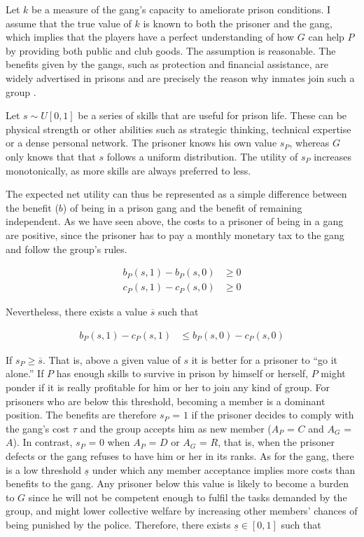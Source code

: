 \documentclass[a4paper,12pt]{article}
\let\footnote=\endnote
\begin{document}
Let $k$ be a measure of the gang's capacity to ameliorate prison conditions. I assume that the true value of $k$ is known to both the prisoner and the gang, which implies that the players have a perfect understanding of how $G$ can help $P$ by providing both public and club goods. The assumption is reasonable. The benefits given by the gangs, such as protection and financial assistance, are widely advertised in prisons and are precisely the reason why inmates join such a group \citep{fleisher2001overview, trammell2012enforcing}.

Let $s \sim U \left[0,1\right]$ be a series of skills that are useful for prison life. These can be physical strength or other abilities such as strategic thinking, technical expertise or a dense personal network. The prisoner knows his own value $s_P$, whereas $G$ only knows that that $s$ follows a uniform distribution. The utility of $s_P$ increases monotonically, as more skills are always preferred to less. 

The expected net utility can thus be represented as a simple difference between the benefit ($b$) of being in a prison gang and the benefit of remaining independent. As we have seen above, the costs to a prisoner of being in a gang are positive, since the prisoner has to pay a monthly monetary tax to the gang and follow the group's rules. 

\begin{align}
b_P\left(s,1\right) - b_P\left(s,0\right) &\geq 0\\
c_P\left(s,1\right) - c_P\left(s,0\right) &\geq 0
\end{align}

Nevertheless, there exists a value $\overline{s}$ such that

\begin{align}
b_P\left(s,1\right) - c_P\left(s,1\right) &\leq b_P\left(s,0\right) - c_P\left(s,0\right)
\end{align}

If $s_P \geq \overline{s}$. That is, above a given value of $s$ it is better for a prisoner to ``go it alone.''\footnote{Obviously, the opposite is true whether $s_P < \overline{s}$.} If $P$ has enough skills to survive in prison by himself or herself, $P$ might ponder if it is really profitable for him or her to join any kind of group. For prisoners who are below this threshold, becoming a member is a dominant position. The benefits are therefore $s_P$ = $1$ if the prisoner decides to comply with the gang's cost $\tau$ and the group accepts him as new member ($A_P$ = $C$ and $A_G$ = $A$). In contrast, $s_P$ = $0$ when $A_P$ = $D$ or $A_G$ = $R$, that is, when the prisoner defects or the gang refuses to have him or her in its ranks. 
As for the gang, there is a low threshold $\underline{s}$ under which any member acceptance implies more costs than benefits to the gang. Any prisoner below this value is likely to become a burden to $G$ since he will not be competent enough to fulfil the tasks demanded by the group, and might lower collective welfare by increasing other members' chances of being punished by the police. Therefore, there exists $\underline{s} \in \left[0, 1\right]$ such that
\end{document}
